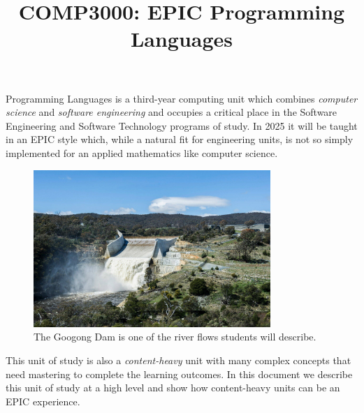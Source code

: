 \documentclass[twoside=false,DIV=14]{scrartcl}
\title{\color{redish} \vspace{-1em}COMP3000: EPIC Programming Languages}
\begin{document}
{\color{blackish}\maketitle}\vspace{-7em}

\begin{abstract}
\end{abstract}
    Programming Languages is a third-year computing unit which combines \emph{computer science} and \emph{software engineering} and occupies a critical place in the Software Engineering and Software Technology programs of study.  In 2025 it will be taught in an EPIC style which, while a natural fit for engineering units, is not so simply implemented for an applied mathematics like computer science.  


\begin{figure}[h]
    \begin{center}
      \includegraphics[width=0.8\textwidth]{googong.jpg}
    \end{center}
    \caption{The Googong Dam is one of the river flows students will describe.}
  \end{figure}
  
  
This unit of study is also a \emph{content-heavy} unit with many complex concepts that need mastering to complete the learning outcomes.  In this document we describe this unit of study at a high level and show how content-heavy units can be an EPIC experience.
\end{document}
